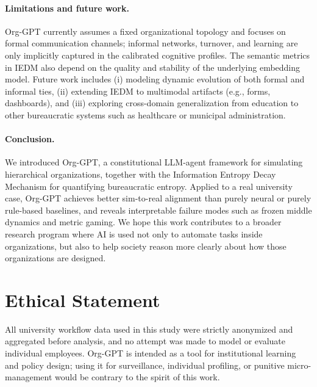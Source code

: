 \documentclass{article}
\begin{document}
\paragraph{Limitations and future work.}
Org-GPT currently assumes a fixed organizational topology and focuses on formal communication channels; informal networks, turnover, and learning are only implicitly captured in the calibrated cognitive profiles. The semantic metrics in IEDM also depend on the quality and stability of the underlying embedding model. Future work includes (i) modeling dynamic evolution of both formal and informal ties, (ii) extending IEDM to multimodal artifacts (e.g., forms, dashboards), and (iii) exploring cross-domain generalization from education to other bureaucratic systems such as healthcare or municipal administration.

\paragraph{Conclusion.}
We introduced Org-GPT, a constitutional LLM-agent framework for simulating hierarchical organizations, together with the Information Entropy Decay Mechanism for quantifying bureaucratic entropy. Applied to a real university case, Org-GPT achieves better sim-to-real alignment than purely neural or purely rule-based baselines, and reveals interpretable failure modes such as frozen middle dynamics and metric gaming. We hope this work contributes to a broader research program where AI is used not only to automate tasks inside organizations, but also to help society reason more clearly about how those organizations are designed.

\section*{Ethical Statement}

All university workflow data used in this study were strictly anonymized and aggregated before analysis, and no attempt was made to model or evaluate individual employees. Org-GPT is intended as a tool for institutional learning and policy design; using it for surveillance, individual profiling, or punitive micro-management would be contrary to the spirit of this work.




\end{document}

